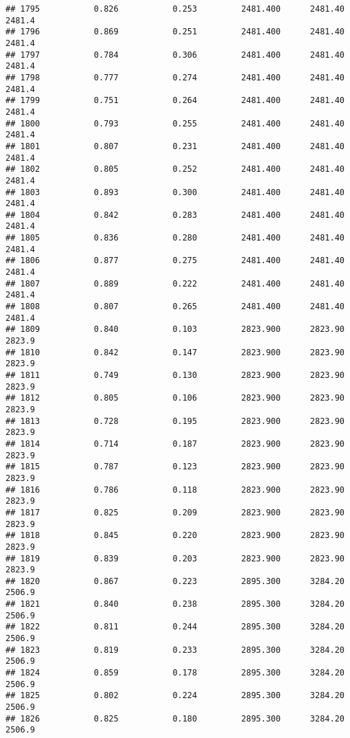 \documentclass[
]{article}
\begin{document}
\begin{verbatim}
## 1795           0.826           0.253         2481.400      2481.40       2481.4
## 1796           0.869           0.251         2481.400      2481.40       2481.4
## 1797           0.784           0.306         2481.400      2481.40       2481.4
## 1798           0.777           0.274         2481.400      2481.40       2481.4
## 1799           0.751           0.264         2481.400      2481.40       2481.4
## 1800           0.793           0.255         2481.400      2481.40       2481.4
## 1801           0.807           0.231         2481.400      2481.40       2481.4
## 1802           0.805           0.252         2481.400      2481.40       2481.4
## 1803           0.893           0.300         2481.400      2481.40       2481.4
## 1804           0.842           0.283         2481.400      2481.40       2481.4
## 1805           0.836           0.280         2481.400      2481.40       2481.4
## 1806           0.877           0.275         2481.400      2481.40       2481.4
## 1807           0.889           0.222         2481.400      2481.40       2481.4
## 1808           0.807           0.265         2481.400      2481.40       2481.4
## 1809           0.840           0.103         2823.900      2823.90       2823.9
## 1810           0.842           0.147         2823.900      2823.90       2823.9
## 1811           0.749           0.130         2823.900      2823.90       2823.9
## 1812           0.805           0.106         2823.900      2823.90       2823.9
## 1813           0.728           0.195         2823.900      2823.90       2823.9
## 1814           0.714           0.187         2823.900      2823.90       2823.9
## 1815           0.787           0.123         2823.900      2823.90       2823.9
## 1816           0.786           0.118         2823.900      2823.90       2823.9
## 1817           0.825           0.209         2823.900      2823.90       2823.9
## 1818           0.845           0.220         2823.900      2823.90       2823.9
## 1819           0.839           0.203         2823.900      2823.90       2823.9
## 1820           0.867           0.223         2895.300      3284.20       2506.9
## 1821           0.840           0.238         2895.300      3284.20       2506.9
## 1822           0.811           0.244         2895.300      3284.20       2506.9
## 1823           0.819           0.233         2895.300      3284.20       2506.9
## 1824           0.859           0.178         2895.300      3284.20       2506.9
## 1825           0.802           0.224         2895.300      3284.20       2506.9
## 1826           0.825           0.180         2895.300      3284.20       2506.9

\end{verbatim}
\end{document}
